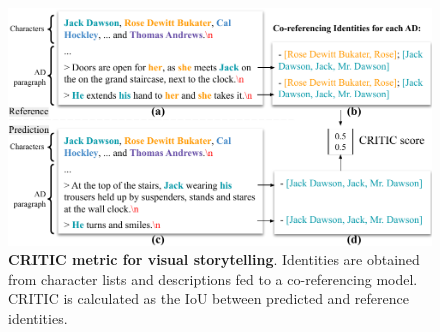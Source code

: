 \begin{figure}[t!]
    \centering
    \includegraphics[width=\linewidth]{figs/CRITIC2.pdf}
    \caption{\textbf{CRITIC metric for visual storytelling}. Identities are obtained from character lists and descriptions fed to a co-referencing model. CRITIC  is calculated as the IoU between predicted and reference identities.}
    \label{fig:CRITIC}
\end{figure}

